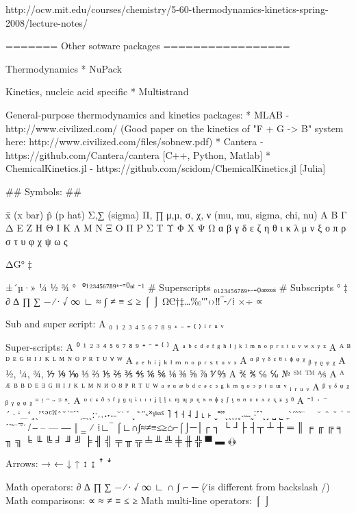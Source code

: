 http://ocw.mit.edu/courses/chemistry/5-60-thermodynamics-kinetics-spring-2008/lecture-notes/




======= Other sotware packages =================


Thermodynamics
* NuPack


Kinetics, nucleic acid specific
* Multistrand

General-purpose thermodynamics and kinetics packages:
* MLAB - http://www.civilized.com/ (Good paper on the kinetics of "F + G -> B" system here: http://www.civilized.com/files/sobnew.pdf)
* Cantera - https://github.com/Cantera/cantera   [C++, Python, Matlab]
* ChemicalKinetics.jl - https://github.com/scidom/ChemicalKinetics.jl  [Julia]



## Symbols: ##

    x̄  (x bar)
    p̂  (p hat)
    Σ,∑  (sigma)
    Π, ∏
    μ,µ, σ, χ, ν (mu, mu, sigma, chi, nu)
    Α Β Γ Δ Ε Ζ Η Θ Ι Κ Λ Μ Ν Ξ Ο Π Ρ Σ Τ Υ Φ Χ Ψ Ω
    α β γ δ ε ζ η θ ι κ λ μ ν ξ ο π ρ σ τ υ φ χ ψ ω ς

    ΔG°
    ‡

    ±´µ·» ¼ ½ ¾ ° ­
    ⁰¹²³⁴⁵⁶⁷⁸⁹⁺⁻⁼⁽⁾ⁿⁱ  ⁻¹       # Superscripts
    ₀₁₂₃₄₅₆₇₈₉₊₋₌₍₎ₐₑₒₓₔᵢ       # Subscripts
    ° ‡
    ∂ ∆ ∏ ∑ − ∕ ∙ √ ∞ ∟ ≈ ∫ ≠ ≡ ≤ ≥ ⌠ ⌡
    Ω℮†‡…‰′″‹›‼‾⁃⁄⁞
    ×÷ ∝

    Sub and super script:
    A ₀ ₁ ₂ ₃ ₄ ₅ ₆ ₇ ₈ ₉ ₊ ₋ ₌ ₍ ₎ ᵢ ᵣ ᵤ ᵥ

    Super-scripts:
    A ⁰ ¹ ² ³ ⁴ ⁵ ⁶ ⁷ ⁸ ⁹ ⁺ ⁻ ⁼ ⁽ ⁾
    A ᵃ ᵇ ᶜ ᵈ ᵉ ᶠ ᵍ ʰ ⁱ ʲ ᵏ ˡ ᵐ ⁿ ᵒ ᵖ ʳ ˢ ᵗ ᵘ ᵛ ʷ ˣ ʸ ᶻ
    A ᴬ ᴮ ᴰ ᴱ ᴳ ᴴ ᴵ ᴶ ᴷ ᴸ ᴹ ᴺ ᴼ ᴾ ᴿ ᵀ ᵁ ⱽ ᵂ
    A ₐ ₑ ₕ ᵢ ⱼ ₖ ₗ ₘ ₙ ₒ ₚ ᵣ ₛ ₜ ᵤ ᵥ ₓ
    A ᵅ ᵝ ᵞ ᵟ ᵋ ᶿ ᶥ ᶲ ᵠ ᵡ ᵦ ᵧ ᵨ ᵩ ᵪ
    A ½, ¼, ¾, ⅐ ⅑ ⅒ ⅓ ⅔ ⅕ ⅖ ⅗ ⅘ ⅙ ⅚ ⅛ ⅜ ⅝ ⅞ ⅟ ↉
    A ℀ ℁ ℅ ℆ № ℠ ™ ⅍
    A ᴬ ᴭ ᴮ ᴯ ᴰ ᴱ ᴲ ᴳ ᴴ ᴵ ᴶ ᴷ ᴸ ᴹ ᴺ ᴻ ᴼ ᴽ ᴾ ᴿ ᵀ ᵁ ᵂ ᵃ ᵄ ᵅ ᵆ ᵇ ᵈ ᵉ ᵊ ᵋ ᵌ ᵍ ᵏ ᵐ ᵑ ᵒ ᵓ ᵖ ᵗ ᵘ ᵚ ᵛ ᵢ ᵣ ᵤ ᵥ
    A ᵝ ᵞ ᵟ ᵠ ᵡ ᵦ ᵧ ᵨ ᵩ ᵪ ᵸ ᵎ ᵔ ᵕ ᵙ ᵜ.
    A ᶛ ᶜ ᶝ ᶞ ᶟ ᶠ ᶡ ᶢ ᶣ ᶤ ᶥ ᶦ ᶧ ᶨ ᶩ ᶪ ᶫ ᶬ ᶭ ᶮ ᶯ ᶰ ᶱ ᶲ ᶳ ᶴ ᶵ ᶶ ᶷ ᶸ ᶹ ᶺ ᶻ ᶼ ᶽ ᶾ ᶿ
    A ⁻¹
 ˑ
    ¯´·`_ʻ¸ˎʼʽʾʿˀˁˆˇˈˉˊˋˌˍˎˏːˑ˒˓˔˕˖˗˘˙˚˛˜˝˞˟ˠˡˢˣˤ ˥ ˦ ˧ ˨ ˩ ˪ ˫ ˬ˭ˮ˯˰˱˲˳˴˵˶˷˸˹˺˻˼ ˽ ˾ ˿ ̀  ́ ̂ ̃ ̄
    ~ ˘ ˆ ˇ  ˈ ˉ ˊˋ ̃ ̄  ̅  ̆  ̇
    ̸
    ‒ – — ―  ‖ ‗
    ⁄ ⁞∟‾ ⌠∟∩∫≈≠≡≤≥⌂⌐⌠⌡─│┌ ┐ └ ┘├ ┤┬ ┴ ┼ ═ ║ ╒ ╓ ╔ ╕ ╖ ╗ ╘ ╙ ╚ ╛ ╜ ╝ ╞ ╢ ╣ ╤ ╥ ╦ ╧ ╨ ╩ ╪ ╫ ╬  ▀ ▬ ﴾﴿

    Arrows:
        → ← ↓ ↑ ↕ ↨ ꜛ ꜜ

    Math operators:
         ∂ ∆ ∏ ∑  − ∕ ∙ √ ∞ ∟ ∩ ∫ ⌐ ─  (∕ is different from backslash /)
    Math comparisons:
        ∝ ≈ ≠ ≡  ≤ ≥
    Math multi-line operators:
        ⌠
        ⌡


